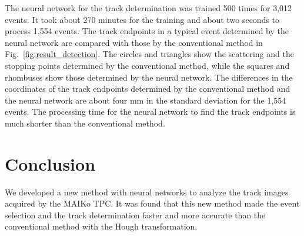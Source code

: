 \documentclass{jps-cp}
\begin{document}
The neural network for the track determination was trained 500 times for 3,012 events.
It took about 270 minutes for the training and about two seconds to process 1,554 events.
The track endpoints in a typical event determined by the neural network are compared with those
by the conventional method in Fig.~\ref{fig:result_detection}.
The circles and triangles show the scattering and the stopping points determined by the conventional method,
while the squares and rhombuses show those determined by the neural network.
The differences in the coordinates of the track endpoints determined by the conventional method
and the neural network are about four mm in the standard deviation for the 1,554 events.
The processing time for the neural network to find the track endpoints is much shorter than the conventional method.


\section{Conclusion}
We developed a new method with neural networks to analyze the track images acquired by the MAIKo TPC.
It was found that this new method made the event selection and the track determination faster and more accurate
than the conventional method with the Hough transformation.
\end{document}
